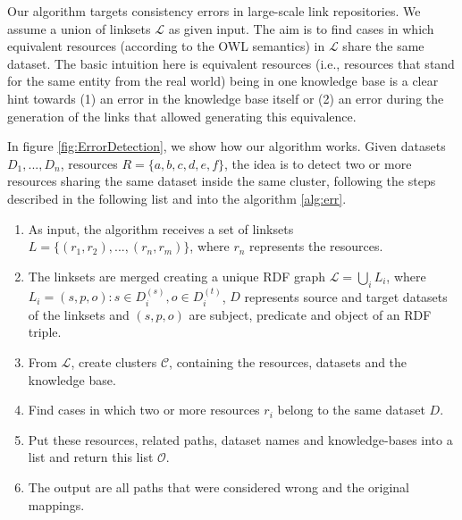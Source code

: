 Our algorithm targets consistency errors in large-scale link repositories. We assume a union of linksets $\mathcal{L}$ as given input. The aim is to find cases in which equivalent resources (according to the OWL semantics) in $\mathcal{L}$ share the same dataset. The basic intuition here is equivalent resources (i.e., resources that stand for the same entity from the real world) being in one knowledge base is a clear hint towards (1) an error in the knowledge base itself or (2) an error during the generation of the links that allowed generating this equivalence.



In figure \ref{fig:ErrorDetection}, we show how our algorithm works. Given datasets $D_1,...,D_n$, resources $R=\{a,b,c,d,e,f\}$, the idea is to detect two or more resources sharing the same dataset inside the same cluster, following the steps described in the following list and into the algorithm \ref{alg:err}.

\begin{enumerate}
	\item As input, the algorithm receives a set of linksets $L=\{(r_1,r_2),...,(r_n,r_m)\}$, where $r_n$ represents the resources.
	\item The linksets are merged creating a unique RDF graph $\mathcal{L}= \bigcup_i L_i$, where $L_i={(s,p,o):s \in D_i^{(s)}, o \in D_i^{(t)}}$, $D$ represents source and target datasets of the linksets and $(s,p,o)$ are subject, predicate and object of an RDF triple.
	\item From $\mathcal{L}$, create clusters $\mathcal{C}$, containing the resources, datasets and the knowledge base.
	\item Find cases in which two or more resources $r_i$ belong to the same dataset $D$.
	\item Put these resources, related paths, dataset names and knowledge-bases into a list and return this list $\mathcal{O}$. %
	\item The output are all paths that were considered wrong and the original mappings.
\end{enumerate}

